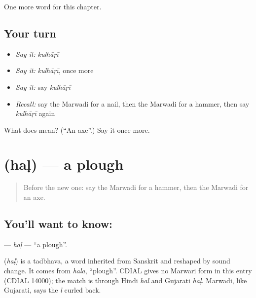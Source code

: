 \begin{grammarlens}[title={What you've built}]
One more word for this chapter.
\end{grammarlens}

\subsection*{Your turn}
\begin{itemize}
\raggedright
  \item \emph{Say it:} \emph{kulhāṛī}
  \item \emph{Say it:} \emph{kulhāṛī}, once more
  \item \emph{Say it:} say \emph{kulhāṛī}
  \item \emph{Recall:} say the Marwadi for a nail, then the Marwadi for a hammer, then say \emph{kulhāṛī} again
\end{itemize}

\begin{tcolorbox}[breakable,colback=teal!4,colframe=teal!35!black,title={Before you move on}]
What does  mean? (\textquotedblleft{}An axe\textquotedblright{}.) Say it once more.
\end{tcolorbox}
\section[\texorpdfstring{\mw{हळ} (haḷ)}{हळ (haḷ)}]{ (haḷ) — a plough}

\label{lesson:MW-C127-hal}



\begin{quote}
Before the new one: say the Marwadi for a hammer, then the Marwadi for an axe.
\end{quote}

\subsection*{You'll want to know: }
\textbf{} — \emph{haḷ} — \textquotedblleft{}a plough\textquotedblright{}.

\begin{cousinweb}
\textbf{} (\emph{haḷ}) is a tadbhava, a word inherited from Sanskrit and reshaped by sound change. It comes from \emph{hala}, \textquotedblleft{}plough\textquotedblright{}. CDIAL gives no Marwari form in this entry (CDIAL 14000); the match is through Hindi \emph{hal} and Gujarati \emph{haḷ}. Marwadi, like Gujarati, says the \emph{l} curled back.
\end{cousinweb}


